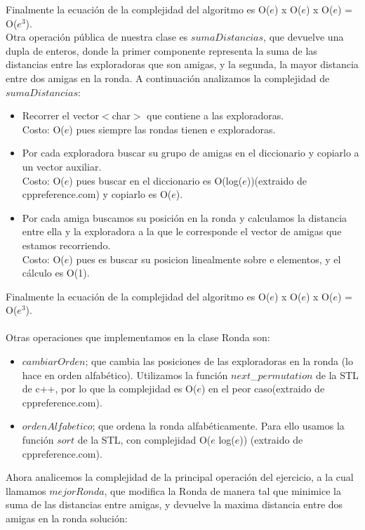 Finalmente la ecuación de la complejidad del algoritmo es O($e$) x O($e$) x O($e$) = O($e^3$). \\
Otra operación pública de nuestra clase es $sumaDistancias$, que devuelve una dupla de enteros, donde la primer componente 
representa la suma de las distancias entre las exploradoras que son amigas, y la segunda, la mayor distancia entre dos amigas en 
la ronda. A continuación analizamos la complejidad de $sumaDistancias$: 
\begin{itemize}
\item Recorrer el vector$<$char$>$ que contiene a las exploradoras. \\
Costo: O($e$) pues siempre las rondas tienen e exploradoras.
\item Por cada exploradora buscar su grupo de amigas en el diccionario y copiarlo a un vector auxiliar. \\
Costo: O($e$) pues buscar en el diccionario es O(log($e$))(extraido de cppreference.com) y copiarlo es O($e$).
\item Por cada amiga buscamos su posición en la ronda y calculamos la distancia entre ella y la exploradora a la que le corresponde el vector de amigas que estamos recorriendo. \\
Costo: O($e$) pues es buscar su posicion linealmente sobre e elementos, y el cálculo es O(1).
\end{itemize}
Finalmente la ecuación de la complejidad del algoritmo es O($e$) x O($e$) x O($e$) = O($e^3$). \\
\\
Otras operaciones que implementamos en la clase Ronda son: 
\begin{itemize}
\item $cambiarOrden$; que cambia las posiciones de las exploradoras en la ronda (lo hace en orden alfabético). Utilizamos la función 
$next$\_$permutation$ de la STL de c++, por lo que la complejidad es O($e$) en el peor caso(extraido de cppreference.com). 
\item $ordenAlfabetico$; que ordena la ronda alfabéticamente. Para ello usamos la función $sort$ de la STL, con complejidad
O($e$ log($e$)) (extraido de cppreference.com).
\end{itemize}
Ahora analicemos la complejidad de la principal operación del ejercicio, a la cual llamamos $mejorRonda$, que modifica la Ronda de manera
tal que minimice la suma de las distancias entre amigas, y devuelve la maxima distancia entre dos amigas en la ronda solución: 
